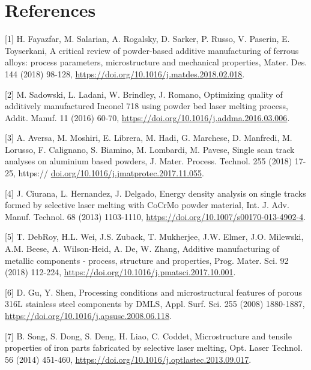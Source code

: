 \documentclass[10pt]{article}
\begin{document}
\section*{References}
[1] H. Fayazfar, M. Salarian, A. Rogalsky, D. Sarker, P. Russo, V. Paserin, E. Toyserkani, A critical review of powder-based additive manufacturing of ferrous alloys: process parameters, microstructure and mechanical properties, Mater. Des. 144 (2018) 98-128, \href{https://doi.org/10.1016/j.matdes.2018.02.018}{https://doi.org/10.1016/j.matdes.2018.02.018}.

[2] M. Sadowski, L. Ladani, W. Brindley, J. Romano, Optimizing quality of additively manufactured Inconel 718 using powder bed laser melting process, Addit. Manuf. 11 (2016) 60-70, \href{https://doi.org/10.1016/j.addma.2016.03.006}{https://doi.org/10.1016/j.addma.2016.03.006}.

[3] A. Aversa, M. Moshiri, E. Librera, M. Hadi, G. Marchese, D. Manfredi, M. Lorusso, F. Calignano, S. Biamino, M. Lombardi, M. Pavese, Single scan track analyses on aluminium based powders, J. Mater. Process. Technol. 255 (2018) 17-25, https:// \href{http://doi.org/10.1016/j.jmatprotec.2017.11.055}{doi.org/10.1016/j.jmatprotec.2017.11.055}.

[4] J. Ciurana, L. Hernandez, J. Delgado, Energy density analysis on single tracks\\
formed by selective laser melting with CoCrMo powder material, Int. J. Adv. Manuf. Technol. 68 (2013) 1103-1110, \href{https://doi.org/10.1007/s00170-013-4902-4}{https://doi.org/10.1007/s00170-013-4902-4}.

[5] T. DebRoy, H.L. Wei, J.S. Zuback, T. Mukherjee, J.W. Elmer, J.O. Milewski, A.M. Beese, A. Wilson-Heid, A. De, W. Zhang, Additive manufacturing of metallic components - process, structure and properties, Prog. Mater. Sci. 92 (2018) 112-224, \href{https://doi.org/10.1016/j.pmatsci.2017.10.001}{https://doi.org/10.1016/j.pmatsci.2017.10.001}.

[6] D. Gu, Y. Shen, Processing conditions and microstructural features of porous 316L stainless steel components by DMLS, Appl. Surf. Sci. 255 (2008) 1880-1887, \href{https://doi.org/10.1016/j.apsusc.2008.06.118}{https://doi.org/10.1016/j.apsusc.2008.06.118}.

[7] B. Song, S. Dong, S. Deng, H. Liao, C. Coddet, Microstructure and tensile properties of iron parts fabricated by selective laser melting, Opt. Laser Technol. 56 (2014) 451-460, \href{https://doi.org/10.1016/j.optlastec.2013.09.017}{https://doi.org/10.1016/j.optlastec.2013.09.017}.
\end{document}
